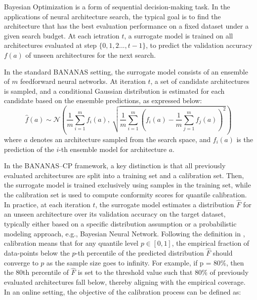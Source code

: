 \documentclass[a4paper,oneside,bibliography=totoc]{scrbook}
\begin{document}
{{\begin{algorithm}[htbp]
\begin{algorithmic}[1]
{\begin{enumerate}
{			\item Denote $a_{t+1}$ as the candidate architecture with maximum $\myfunc{\phi(a)}$; evaluate $\myfunc{f(a_{t+1})}$.
			\item $\mathcal{A}_{t+1} \leftarrow{\mathcal{A}_{t} \cup \{{a_{t+1}\}}$
		\end{enumerate}
    \ENDFOR 
    \STATE \textbf{Output:} $a^{*}=\operatorname*{argmin}_{t=0,...,T} f(a_{t})$    
  \end{algorithmic}
\end{algorithm}


Bayesian Optimization is a form of sequential decision-making task. In the applications of neural architecture search, the typical goal is to find the architecture that has the best evaluation performance on a fixed dataset under a given search budget. At each ietration $t$, a surrogate model is trained on all architectures evaluated at step $\{0, 1, 2..., t-1\}$, to predict the validation accuracy $f(a)$ of unseen architectures for the next search.

In the standard BANANAS setting, the surrogate model consists of an ensemble of $m$ feedforward neural networks. At iteration $t$, a set of candidate architectures is sampled, and a conditional Gaussian distribution is estimated for each candidate based on the ensemble predictions, as expressed below:
\begin{equation}
\hat{f}(a) \sim \mathcal{N} \left( 
\frac{1}{m} \sum_{i=1}^{m} f_i(a),\ 
\sqrt{\frac{1}{m} \sum_{i=1}^{m} \left(f_i(a) - \frac{1}{m} \sum_{j=1}^{m} f_j(a) \right)^2}
\right)
\label{eq:ensemble_gaussian}
\end{equation}
\noindent
where $a$ denotes an architecture sampled from the search space, and $f_i(a)$ is the prediction of the $i$-th ensemble model for architecture $a$.

In the BANANAS--CP framework, a key distinction is that all previously evaluated architectures are split into a training set and a calibration set. Then, the surrogate model is trained exclusively using samples in the training set, while the calibration set is used to compute conformity scores for quantile calibration. In practice, at each iteration $t$, the surrogate model estimates a distribution $\hat{F}$ for an unseen architecture over its validation accuracy on the target dataset, typically either based on a specific distribution assumption or a probabilistic modeling approach, e.g., Bayesian Neural Network. Following the definition in \cite{deshpande2024online}, calibration means that for any quantile level $p\in [0, 1]$, the empirical fraction of data-points below the $p$-th percentile of the predicted distribution $\hat{F}$ should converge to $p$ as the sample size goes to infinity. For example, if p = 80\%, then the 80th percentile of $\hat{F}$ is set to the threshold value such that 80\% of previously evaluated architectures fall below, thereby aligning with the empirical coverage. In an online setting, the objective of the calibration process can be defined as:

}}
\end{document}
